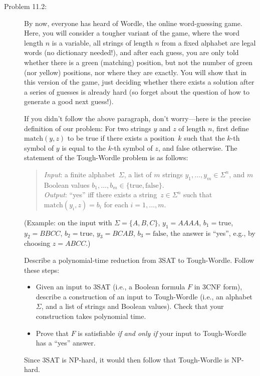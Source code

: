 \documentclass[11pt]{article}
\begin{document}
\begin{description}
\newpage
\item[Problem 11.2:]
By now, everyone has heard of Wordle, the online word-guessing game.
Here, you will consider a tougher variant of the game, where
the word length $n$ is a variable, all strings of length $n$ from a fixed
alphabet are legal words (no dictionary needed!), and after each guess, you are only told
whether there is a green (matching) position, but not the number of green (nor yellow)
positions, nor where they are exactly.  You will show that in this version of the game,
just deciding whether there exists a solution after a series of guesses is already hard (so forget about
the question of how to generate a good next guess!).  


\newcommand{\match}{\textrm{match}}
\newcommand{\true}{\textrm{true}}
\newcommand{\false}{\textrm{false}}
If you didn't follow the above paragraph, don't worry---here is the precise definition of
our problem:
For two strings $y$ and $z$ of length $n$, first define $\match(y,z)$ to be true
if there exists a position~$k$ such that the $k$-th symbol of $y$
is equal to the $k$-th symbol of $z$, and false otherwise.
The statement of the {\sc Tough-Wordle} problem is as follows:
\begin{quote}
{\em Input\/}: a finite alphabet~$\Sigma$, a list of $m$ strings $y_1,\ldots,y_m\in\Sigma^n$,
and $m$ Boolean values $b_1,\ldots,b_m\in\{\true,\false\}$.\\[2pt]
{\em Output\/}: ``yes'' iff there exists a string~$z\in\Sigma^n$
such that $\match(y_i,z)=b_i$ for each $i=1,\ldots,m$.
\end{quote}

(Example: on the input with $\Sigma=\{A,B,C\}$,
$y_1=AAAA$, $b_1=\true$, $y_2=BBCC$, 
$b_2=\true$, $y_3=BCAB$, $b_3=\false$, the answer is ``yes'', e.g., by 
choosing $z=ABCC$.)

Describe a polynomial-time reduction from {\sc 3SAT} to {\sc Tough-Wordle}.  Follow these steps:
\begin{itemize}
\item Given an input to {\sc 3SAT} (i.e., a Boolean formula $F$ in 3CNF form),
describe a construction of an input to {\sc Tough-Wordle} (i.e., an alphabet $\Sigma$, and 
a list of strings and Boolean values).
Check that your construction takes polynomial time.
\item Prove that $F$ is
satisfiable \emph{if and only if} your input to {\sc Tough-Wordle} has a ``yes''
answer.
\end{itemize}
Since {\sc 3SAT} is NP-hard, it would then follow that {\sc Tough-Wordle} is NP-hard. 


\end{description}
\end{document}

